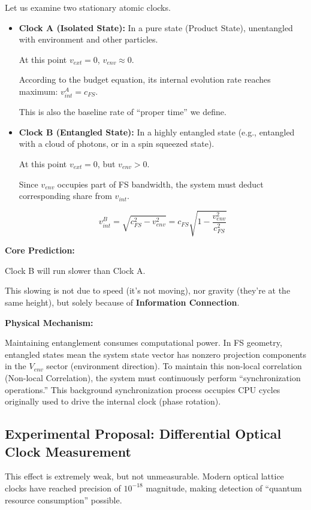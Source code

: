 \documentclass[11pt,a4paper,twoside]{book}
\begin{document}
Let us examine two stationary atomic clocks.

\begin{itemize}
\item \textbf{Clock A (Isolated State):} In a pure state (Product State), unentangled with environment and other particles.

  At this point \textbf{$v_{ext} = 0$}, \textbf{$v_{env} \approx 0$}.

  According to the budget equation, its internal evolution rate reaches maximum: \textbf{$v_{int}^A = c_{FS}$}.

  This is also the baseline rate of ``proper time'' we define.

\item \textbf{Clock B (Entangled State):} In a highly entangled state (e.g., entangled with a cloud of photons, or in a spin squeezed state).

  At this point \textbf{$v_{ext} = 0$}, but \textbf{$v_{env} > 0$}.

  Since \textbf{$v_{env}$} occupies part of FS bandwidth, the system must deduct corresponding share from \textbf{$v_{int}$}.

  $$v_{int}^B = \sqrt{c_{FS}^2 - v_{env}^2} = c_{FS} \sqrt{1 - \frac{v_{env}^2}{c_{FS}^2}}$$
\end{itemize}

\textbf{Core Prediction:}

Clock B will run slower than Clock A.

This slowing is not due to speed (it's not moving), nor gravity (they're at the same height), but solely because of \textbf{Information Connection}.

\textbf{Physical Mechanism:}

Maintaining entanglement consumes computational power. In FS geometry, entangled states mean the system state vector has nonzero projection components in the \textbf{$V_{env}$} sector (environment direction). To maintain this non-local correlation (Non-local Correlation), the system must continuously perform ``synchronization operations.'' This background synchronization process occupies CPU cycles originally used to drive the internal clock (phase rotation).

\subsection{Experimental Proposal: Differential Optical Clock Measurement}

This effect is extremely weak, but not unmeasurable. Modern optical lattice clocks have reached precision of \textbf{$10^{-18}$} magnitude, making detection of ``quantum resource consumption'' possible.
\end{document}
